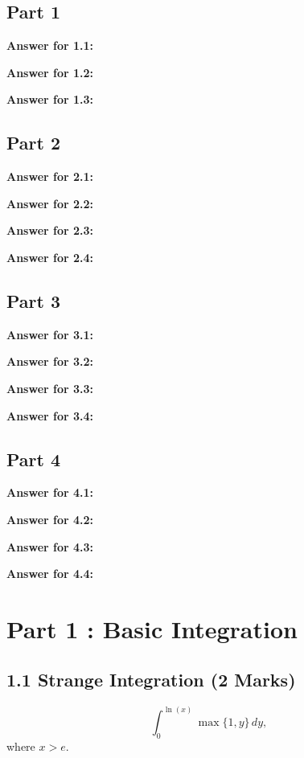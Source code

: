 \documentclass[12pt]{article}
\newcommand{\nullspacebig}{~\\[19pt]}
\begin{document}
\subsection*{Part 1}
\par \textbf{Answer for 1.1: }
\nullspacebig
\par \textbf{Answer for 1.2: }
\nullspacebig
\par \textbf{Answer for 1.3: }
\nullspacebig

\subsection*{Part 2}
\par \textbf{Answer for 2.1: }
\nullspacebig
\par \textbf{Answer for 2.2: }
\nullspacebig
\par \textbf{Answer for 2.3: }
\nullspacebig
\par \textbf{Answer for 2.4: }
\nullspacebig

\subsection*{Part 3} 
\par \textbf{Answer for 3.1: }
\nullspacebig
\par \textbf{Answer for 3.2: }
\nullspacebig
\par \textbf{Answer for 3.3: }
\nullspacebig
\par \textbf{Answer for 3.4: }
\nullspacebig

\subsection*{Part 4}
\par \textbf{Answer for 4.1: }
\nullspacebig
\par \textbf{Answer for 4.2: }
\nullspacebig
\par \textbf{Answer for 4.3: }
\nullspacebig
\par \textbf{Answer for 4.4: }
\nullspacebig

\newpage
\section*{Part 1 : Basic Integration}
\subsection*{1.1 Strange Integration (2 Marks)}
\begin{equation*}
    \int^{\ln(x)}_0 \max \{1, y\}\,dy, 
\end{equation*}
where $x > e$.
\end{document}
